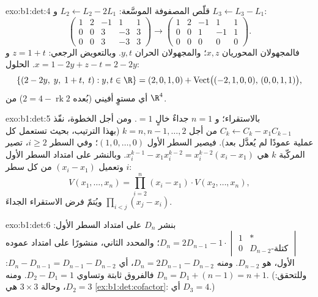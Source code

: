\begin{solution}{exo:b1:det:4}
قلّص المصفوفة الموسَّعة: $L_2 \leftarrow L_2 - 2L_1$ و $L_3
\leftarrow L_3 - L_1$:
\[
\begin{pmatrix}
1 & 2 & -1 & 1 & 1\\
0 & 0 & 3 & -3 & 3\\
0 & 0 & 3 & -3 & 3
\end{pmatrix}
\to
\begin{pmatrix}
1 & 2 & -1 & 1 & 1\\
0 & 0 & 1 & -1 & 1\\
0 & 0 & 0 & 0 & 0
\end{pmatrix}.
\]
فالمجهولان المحوريان $x, z$؛ والمجهولان الحران $y, t$. وبالتعويض الرجعي: $z =
1 + t$ و $x = 1 - 2y + z - t = 2 - 2y$.  الحلول:
\[
\{(2 - 2y,\; y,\; 1 + t,\; t) : y, t \in \R\}
= (2, 0, 1, 0) + \operatorname{Vect}\bigl((-2,1,0,0),\,
(0,0,1,1)\bigr),
\]
أي مستوٍ أفيني (بُعده $2 = 4 - \operatorname{rk} 2$) من $\R^4$.
\end{solution}

\begin{solution}{exo:b1:det:5}
بالاستقراء؛ و $n = 1$ جداءٌ خالٍ $= 1$. ومن أجل الخطوة، نفّذ
$C_k \leftarrow C_k - x_1 C_{k-1}$ من أجل $k = n, n-1, \dots, 2$ (بهذا
الترتيب، بحيث تستعمل كل عملية عمودًا لم يُعدَّل بعد). فيصير
السطر الأول $(1, 0, \dots, 0)$؛ وفي السطر $i \geq 2$، تصير المركّبة
$k$ هي $x_i^{k-1} - x_1 x_i^{k-2} = x_i^{k-2}(x_i - x_1)$.
وبالنشر على امتداد السطر الأول وتعميل $(x_i - x_1)$ من
كل سطر $i$:
\[
V(x_1, \dots, x_n)
= \prod_{i=2}^{n} (x_i - x_1)\cdot V(x_2, \dots, x_n),
\]
ويُتمّ فرض الاستقراء الجداءَ $\prod_{i<j}(x_j
- x_i)$.
\end{solution}

\begin{solution}{exo:b1:det:6}
بنشر $D_n$ على امتداد السطر الأول: $D_n = 2 D_{n-1} -
1\cdot\begin{vmatrix} 1 & \ast\\ 0 & D_{n-2}\text{-كتلة}
\end{vmatrix}$؛ والمحدد الثاني، منشورًا على امتداد عموده
الأول، هو $D_{n-2}$. ومنه $D_n = 2D_{n-1} - D_{n-2}$، أي $D_n -
D_{n-1} = D_{n-1} - D_{n-2}$: فالفروق ثابتة وتساوي
$D_2 - D_1 = 1$. ومنه $D_n = D_1 + (n - 1) = n + 1$.
(وللتحقق: $D_2 = 3$، وحالة $3\times3$ هي
\cref{ex:b1:det:cofactor}: أي $D_3 = 4$.)
\end{solution}

